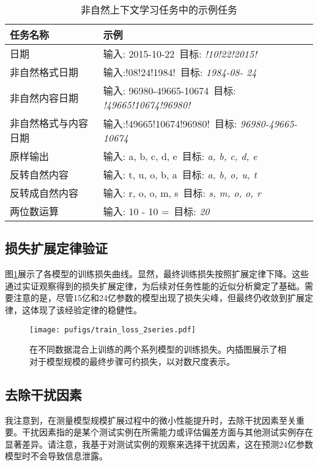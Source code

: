 \begin{table}[!htbp]
    \centering
    \label{tab:unnaturalicl}
    \caption{非自然上下文学习任务中的示例任务}
    \begin{tabular}{p{4cm}l}
        \toprule
        \textbf{任务名称}  & \textbf{示例} \\
        \midrule
        日期  & 输入: 2015-10-22\ 目标: \textit{!10!22!2015!}\\
        非自然格式日期  & 输入:!08!24!1984!\ 目标: \textit{1984-08- 24}\\
        非自然内容日期  & 输入: 96980-49665-10674\ 目标: \textit{!49665!10674!96980!}\\
        非自然格式与内容日期  & 输入:!49665!10674!96980!\ 目标: \textit{96980-49665-10674}\\
        原样输出  & 输入: a, b, c, d, e\ 目标: \textit{a, b, c, d, e} \\
        反转自然内容  & 输入: t, u, o, b, a\ 目标: \textit{a, b, o, u, t} \\
        反转成自然内容  & 输入: r, o, o, m, s\ 目标: \textit{s, m, o, o, r}  \\
        两位数运算  & 输入: 10 - 10 =\ 目标: \textit{20}\\
        \bottomrule
    \end{tabular}
    \label{tab:unnaturalincontextexample}
\end{table}



\subsection{损失扩展定律验证}
图\ref{fig:loss_scaling}展示了各模型的训练损失曲线。显然，最终训练损失按照扩展定律下降。这些通过实证观察得到的损失扩展定律，为后续对任务性能的近似分析奠定了基础。需要注意的是，尽管15亿和24亿参数的模型出现了损失尖峰，但最终仍收敛到扩展定律，这体现了该经验定律的稳健性。


\begin{figure}[!htbp]
        \centering
        \texttt{[image: pufigs/train\_loss\_2series.pdf]}
        \label{fig:train_loss_2series}
\caption{在不同数据混合上训练的两个系列模型的训练损失。内插图展示了相对于模型规模的最终步骤可约损失，以对数尺度表示。 }
    \label{fig:loss_scaling}
\end{figure}



\subsection{去除干扰因素}
\label{app:removing_distracting}
我注意到，在测量模型规模扩展过程中的微小性能提升时，去除干扰因素至关重要。干扰因素指的是某个测试实例在所需能力或评估偏差方面与其他测试实例存在显著差异。请注意，我基于对测试实例的观察来选择干扰因素，这在预测24亿参数模型时不会导致信息泄露。

